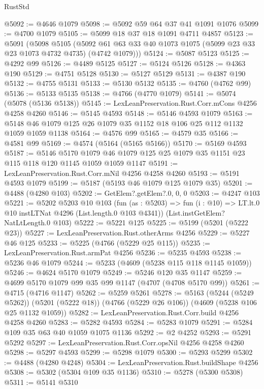 \begin{lexlean}{RustStd}
\begin{coremodule}
@5092 := @4646 @1079
@5098 := @5092 @59 @64 @37 @41 @1091 @1076
@5099 := @4700 @1079
@5105 := @5099 @18 @37 @18 @1091 @4711 @4857
@5123 := @5091
    (@5098
      @5105
      (@5092 @61 @63 @33 @40 @1073 @1075 (@5099 @23 @33 @23 @1073 @4732 @4735) (@4742 @1079)))
@5124 := @5087 @5123
@5125 := @4292 @99
@5126 := @4489 @5125
@5127 := @5124 @5126
@5128 := @4363 @190
@5129 := @4751 @5128
@5130 := @5127 @5129
@5131 := @4387 @190
@5132 := @4755 @5131
@5133 := @5130 @5132
@5135 := @4760 (@4762 @99)
@5136 := @5133 @5135
@5138 := @4766 (@4770 @1079)
@5141 := @5074 (@5078 (@5136 @5138))
@5145 := LexLeanPreservation.Rust.Corr.mCons @4256 @4258 @4260
@5146 := @5145 @4593
@5148 := @5146 @4593 @1079
@5163 := @5148 @46 @1079 @125 @26 @1079 @35 @1152 @18 @106 @25 @112 @1132 @1059 @1059 @1138
@5164 := @4576 @99
@5165 := @4579 @35
@5166 := @4581 @99
@5169 := @4574 (@5164 (@5165 @5166))
@5170 := @5169 @4593
@5187 := @5146
    @5170
    @1079
    @46
    @1079
    @125
    @25
    @1079
    @35
    @1151
    @23
    @115
    @118
    @120
    @1145
    @1059
    @1059
    @1147
@5191 := LexLeanPreservation.Rust.Corr.mNil @4256 @4258 @4260
@5193 := @5191 @4593 @1079
@5199 := @5187 (@5193 @46 @1079 @125 @1079 @35)
@5201 := @4488 (@4280 @103)
@5202 := GetElem?.getElem?.{0, 0, 0}
@5203 := @4247 @103
@5221 := @5202
    @5203
    @10
    @103
    (fun (as : @5203) =>
    fun (i : @10) => LT.lt.{0} @10 instLTNat @4296 (List.length.{0} @103 @4341))
    (List.instGetElem?NatLtLength.{0} @103)
@5222 := @5221 @125
@5225 := @5199 (@5201 (@5222 @23))
@5227 := LexLeanPreservation.Rust.otherArms @4256
@5229 := @5227 @46 @125
@5233 := @5225 (@4766 (@5229 @25 @115))
@5235 := LexLeanPreservation.Rust.armPat @4256
@5236 := @5235 @4593
@5238 := @5236 @46 @1079
@5244 := @5233 (@4609 (@5238 @115 @118 @1145 @1059))
@5246 := @4624 @5170 @1079
@5249 := @5246 @120 @35 @1147
@5259 := @4699 @5170 @1079 @99 @35 @99 @1147 (@4707 (@4708 @5170 @99))
@5261 := @4715 (@4716 @1147)
@5262 := @5259 @5261
@5278 := @5163
    (@5244 (@5249 @5262))
    (@5201 (@5222 @18))
    (@4766 (@5229 @26 @106))
    (@4609 (@5238 @106 @25 @1132 @1059))
@5282 := LexLeanPreservation.Rust.Corr.build @4256 @4258 @4260
@5283 := @5282 @4593
@5284 := @5283 @1079
@5291 := @5284 @109 @35 @63 @40 @1059 @1075 @1136
@5292 := @2 @4252
@5293 := @5291 @5292
@5297 := LexLeanPreservation.Rust.Corr.opsNil @4256 @4258 @4260
@5298 := @5297 @4593
@5299 := @5298 @1079
@5300 := @5293 @5299
@5302 := @4488 (@4280 @4248)
@5304 := LexLeanPreservation.Rust.buildShape @4256
@5308 := @5302 (@5304 @109 @35 @1136)
@5310 := @5278 (@5300 @5308)
@5311 := @5141 @5310

\end{coremodule}
\end{lexlean}

